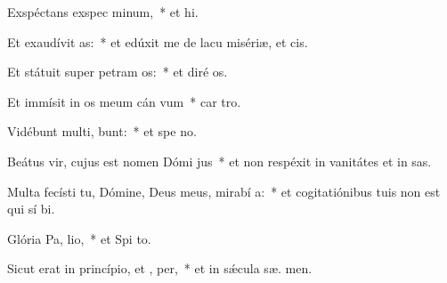 \item Exspéctans exspec minum,~* et  hi.
\item Et exaudívit  as:~* et edúxit me de lacu misériæ, et   cis.
\item Et státuit super petram  os:~* et diré  os.
\item Et immísit in os meum cán vum~* car  tro.
\item Vidébunt multi,  bunt:~* et spe  no.
\item Beátus vir, cujus est nomen Dómi  jus~* et non respéxit in vanitátes et in sas.
\item Multa fecísti tu, Dómine, Deus meus, mirabí a:~* et cogitatiónibus tuis non est qui sí  bi.
\item Glória Pa,  lio,~* et Spi to.
\item Sicut erat in princípio, et ,  per,~* et in sǽcula sæ. men.
